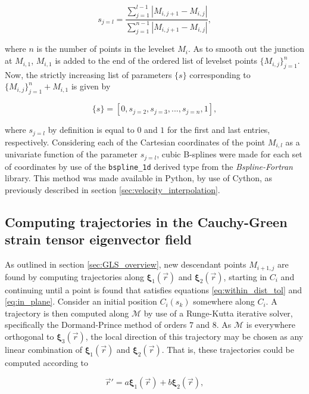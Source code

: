 \begin{equation}
s_{j=l} = \frac{\sum_{j=1}^{l-1}\left|M_{i,j+1}-M_{i,j}\right|}{\sum_{j=1}^{n-1}\left|M_{i,j+1}-M_{i,j}\right|},
\end{equation}

\noindent where $n$ is the number of points in the levelset $M_i$. As to smooth out the junction at $M_{i,1}$, $M_{i,1}$ is added to the end of the ordered list of levelset points $\{M_{i,j}\}_{j=1}^n$. Now, the strictly increasing list of parameters $\{s\}$ corresponding to $\{M_{i,j}\}_{j=1}^n + M_{i,1}$ is given by

\begin{equation}
\{s\} = [0,s_{j=2},s_{j=3},...,s_{j=n},1],
\end{equation}

\noindent where $s_{j=l}$ by definition is equal to $0$ and $1$ for the first and last entries, respectively. Considering each of the Cartesian coordinates of the point $M_{i,l}$ as a univariate function of the parameter $s_{j=l}$, cubic B-splines were made for each set of coordinates by use of the \texttt{bspline\_}\texttt{1d} derived type from the \textit{Bspline-Fortran} library. This method was  made available in Python, by use of Cython, as previously described in section \ref{sec:velocity_interpolation}. 

\subsection{Computing trajectories in the Cauchy-Green strain tensor eigenvector field}\label{sec:trajectories}

As outlined in section \ref{sec:GLS_overview}, new descendant points $M_{i+1,j}$ are found by computing trajectories along $\bm{\xi}_1(\vec{r})$ and $\bm{\xi}_2(\vec{r})$, starting in $C_i$ and continuing until a point is found that satisfies equations \eqref{eq:within_dist_tol} and \eqref{eq:in_plane}. Consider an initial position $C_i(s_k)$ somewhere along $C_i$. A trajectory is then computed along $\mathcal{M}$ by use of a Runge-Kutta iterative solver, specifically the Dormand-Prince method of orders $7$ and $8$. As $\mathcal{M}$ is everywhere orthogonal to $\bm{\xi}_3(\vec{r})$, the local direction of this trajectory may be chosen as any linear combination of $\bm{\xi}_1(\vec{r})$ and $\bm{\xi}_2(\vec{r})$. That is, these trajectories could be computed according to

\begin{equation}\label{eq:traj_linear_combination}
\vec{r}' = a\bm{\xi}_1(\vec{r}) + b\bm{\xi}_2(\vec{r}),
\end{equation}

